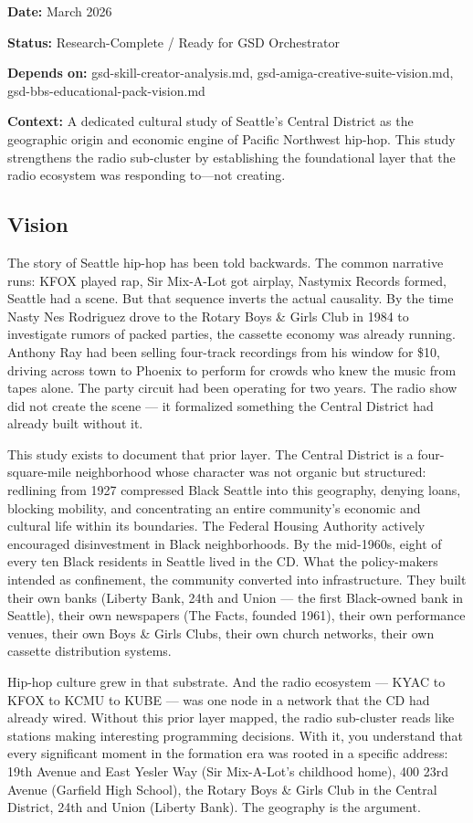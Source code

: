 \documentclass[11pt,letterpaper]{article}
\newcommand{\metafield}[2]{\textbf{\sffamily #1} #2\par}
\begin{document}
\metafield{Date:}{March 2026}
\metafield{Status:}{Research-Complete / Ready for GSD Orchestrator}
\metafield{Depends on:}{gsd-skill-creator-analysis.md, gsd-amiga-creative-suite-vision.md, gsd-bbs-educational-pack-vision.md}
\metafield{Context:}{A dedicated cultural study of Seattle's Central District as the geographic origin and economic engine of Pacific Northwest hip-hop. This study strengthens the radio sub-cluster by establishing the foundational layer that the radio ecosystem was responding to---not creating.}

\subsection{Vision}

The story of Seattle hip-hop has been told backwards. The common narrative runs: KFOX played rap, Sir Mix-A-Lot got airplay, Nastymix Records formed, Seattle had a scene. But that sequence inverts the actual causality. By the time Nasty Nes Rodriguez drove to the Rotary Boys \& Girls Club in 1984 to investigate rumors of packed parties, the cassette economy was already running. Anthony Ray had been selling four-track recordings from his window for \$10, driving across town to Phoenix to perform for crowds who knew the music from tapes alone. The party circuit had been operating for two years. The radio show did not create the scene --- it formalized something the Central District had already built without it.

This study exists to document that prior layer. The Central District is a four-square-mile neighborhood whose character was not organic but structured: redlining from 1927 compressed Black Seattle into this geography, denying loans, blocking mobility, and concentrating an entire community's economic and cultural life within its boundaries. The Federal Housing Authority actively encouraged disinvestment in Black neighborhoods. By the mid-1960s, eight of every ten Black residents in Seattle lived in the CD. What the policy-makers intended as confinement, the community converted into infrastructure. They built their own banks (Liberty Bank, 24th and Union --- the first Black-owned bank in Seattle), their own newspapers (The Facts, founded 1961), their own performance venues, their own Boys \& Girls Clubs, their own church networks, their own cassette distribution systems.

Hip-hop culture grew in that substrate. And the radio ecosystem --- KYAC to KFOX to KCMU to KUBE --- was one node in a network that the CD had already wired. Without this prior layer mapped, the radio sub-cluster reads like stations making interesting programming decisions. With it, you understand that every significant moment in the formation era was rooted in a specific address: 19th Avenue and East Yesler Way (Sir Mix-A-Lot's childhood home), 400 23rd Avenue (Garfield High School), the Rotary Boys \& Girls Club in the Central District, 24th and Union (Liberty Bank). The geography is the argument.
\end{document}
